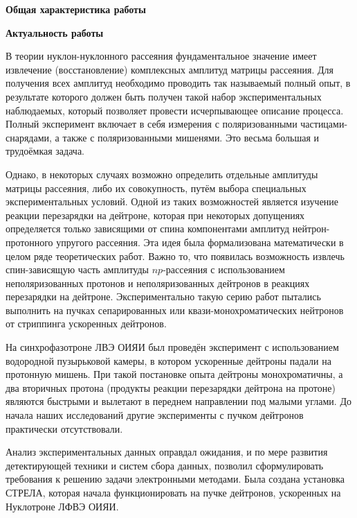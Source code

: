 \clearpage
\setcounter{page}{1}
\begin{center}
  {\large\textbf{Общая характеристика работы}}
\end{center}
\noindent \textbf{Актуальность работы}

В теории нуклон-нуклонного рассеяния фундаментальное значение \linebreak
имеет извлечение (восстановление) комплексных амплитуд матрицы рассеяния. Для
получения всех амплитуд необходимо проводить так называемый полный опыт, в
результате которого должен быть получен такой набор экспериментальных
наблюдаемых, который позволяет провести исчерпывающее описание процесса. Полный
эксперимент включает в себя измерения с поляризованными частицами-снарядами, а
также с поляризованными мишенями. Это весьма большая и трудоёмкая задача.

Однако, в некоторых случаях возможно определить отдельные амплитуды матрицы
рассеяния, либо их совокупность, путём выбора специальных экспериментальных
условий. Одной из таких возможностей является изучение реакции перезарядки на
дейтроне, которая при некоторых допущениях определяется только зависящими от
спина компонентами амплитуд нейтрон-протонного упругого рассеяния. Эта идея была
формализована математически в целом ряде теоретических работ. Важно то, что
появилась возможность извлечь спин-зависящую часть амплитуды $np$-рассеяния с
использованием неполяризованных протонов и неполяризованных дейтронов в реакциях
перезарядки на дейтроне. Экспериментально такую серию работ пытались выполнить
на пучках сепарированных или квази-монохроматических нейтронов от стриппинга
ускоренных дейтронов.

На синхрофазотроне ЛВЭ ОИЯИ был проведён эксперимент с использованием водородной
пузырьковой камеры, в котором ускоренные дейтроны падали на протонную мишень.
При такой постановке опыта \mbox{дейтроны} монохроматичны, а два вторичных
протона (продукты реакции перезарядки дейтрона на протоне) являются быстрыми и
вылетают в переднем направлении под малыми углами. До начала наших исследований
другие эксперименты с пучком дейтронов практически отсутствовали.

Анализ экспериментальных данных оправдал ожидания, и по мере развития
детектирующей техники и систем сбора данных, позволил сформулировать требования
к решению задачи электронными методами. Была создана установка СТРЕЛА, которая
начала функционировать на пучке дейтронов, ускоренных на Нуклотроне ЛФВЭ ОИЯИ.

